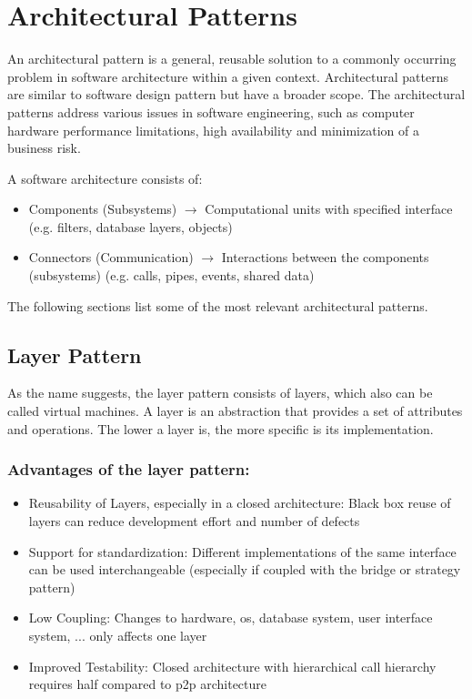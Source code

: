 
\section{Architectural Patterns}
An architectural pattern is a general, reusable solution to a commonly occurring problem in software architecture within a given context.
Architectural patterns are similar to software design pattern but have a broader scope.
The architectural patterns address various issues in software engineering, such as computer hardware performance limitations, high availability and minimization of a business risk.

A software architecture consists of:
\begin{itemize}
	\item Components (Subsystems)
	\subitem $\rightarrow$ Computational units with specified interface (e.g. filters, database layers, objects)
	\item Connectors (Communication)
	\subitem $\rightarrow$ Interactions between the components (subsystems) (e.g. calls, pipes, events, shared data)
\end{itemize}

The following sections list some of the most relevant architectural patterns.
\newpage

\subsection{Layer Pattern}
As the name suggests, the layer pattern consists of layers, which also can be called virtual machines.
A layer is an abstraction that provides a set of attributes and operations.
The lower a layer is, the more specific is its implementation.\newline

\subsubsection*{Advantages of the layer pattern:}
\begin{itemize}
	\item Reusability of Layers, especially in a closed architecture:
		\subitem Black box reuse of layers can reduce development effort and number of defects
	\item Support for standardization:
		\subitem Different implementations of the same interface can be used interchangeable
		\subitem (especially if coupled with the bridge or strategy pattern)
	\item Low Coupling:
		\subitem Changes to hardware, os, database system, user interface
		system, ... only affects one layer
	\item Improved Testability:
		\subitem Closed architecture with hierarchical call hierarchy requires half
		compared to p2p architecture
\end{itemize}

